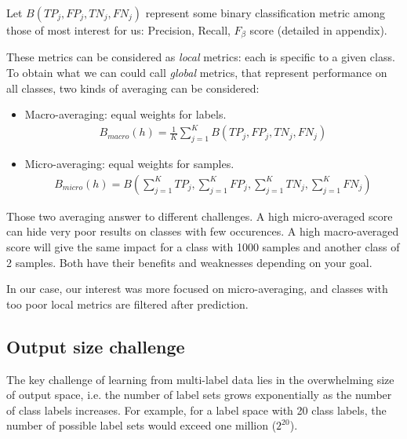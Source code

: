 Let $B(TP_j, FP_j, TN_j, FN_j)$ represent some binary classification metric among those of most interest for us: Precision, Recall, $F_{\beta}$ score (detailed in appendix). 

These metrics can be considered as \textit{local} metrics: each is specific to a given class. To obtain what we can could call \textit{global} metrics, that represent performance on all classes, two kinds of averaging can be considered:

\begin{itemize}
	\item Macro-averaging: equal weights for labels.
	\begin{align}
		B_{macro}(h) = \frac{1}{K}\sum_{j=1}^K B(TP_j, FP_j, TN_j, FN_j)
	\end{align}
	\item Micro-averaging: equal weights for samples.
	\begin{align}
		B_{micro}(h) = B(\sum_{j=1}^K TP_j, \sum_{j=1}^K FP_j,\sum_{j=1}^K  TN_j,\sum_{j=1}^K  FN_j)
	\end{align}
\end{itemize}


Those two averaging answer to different challenges. A high micro-averaged score can hide very poor results on classes with few occurences. A high macro-averaged score will give the same impact for a class with 1000 samples and another class of 2 samples. Both have their benefits and weaknesses depending on your goal.

In our case, our interest was more focused on micro-averaging, and classes with too poor local metrics are filtered after prediction.

\subsection{Output size challenge}

The key challenge of learning from multi-label data lies in the overwhelming size of output space, i.e. the number of label sets grows exponentially as the number of class labels increases. For example, for a label space with 20 class labels, the number of possible label sets would exceed one million ($2^{20}$).

